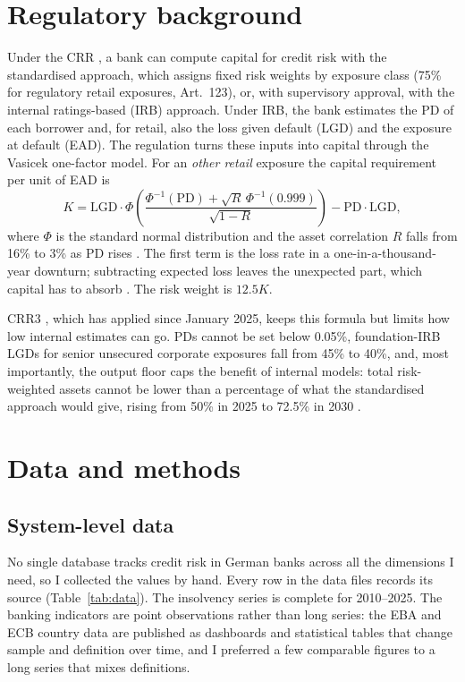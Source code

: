 \documentclass[11pt,a4paper]{article}
\begin{document}
\section{Regulatory background}
Under the CRR \citep{crr}, a bank can compute capital for credit risk with the standardised approach, which assigns fixed risk weights by exposure class (75\% for regulatory retail exposures, Art.~123), or, with supervisory approval, with the internal ratings-based (IRB) approach. Under IRB, the bank estimates the PD of each borrower and, for retail, also the loss given default (LGD) and the exposure at default (EAD). The regulation turns these inputs into capital through the Vasicek one-factor model. For an \textit{other retail} exposure the capital requirement per unit of EAD is
\begin{equation}
K = \text{LGD}\cdot\Phi\!\left(\frac{\Phi^{-1}(\text{PD})+\sqrt{R}\,\Phi^{-1}(0.999)}{\sqrt{1-R}}\right)-\text{PD}\cdot\text{LGD},
\end{equation}
where $\Phi$ is the standard normal distribution and the asset correlation $R$ falls from 16\% to 3\% as PD rises \citep[Art.~154]{crr}. The first term is the loss rate in a one-in-a-thousand-year downturn; subtracting expected loss leaves the unexpected part, which capital has to absorb \citep{bcbs2005}. The risk weight is $12.5K$.

CRR3 \citep{crr3}, which has applied since January 2025, keeps this formula but limits how low internal estimates can go. PDs cannot be set below 0.05\%, foundation-IRB LGDs for senior unsecured corporate exposures fall from 45\% to 40\%, and, most importantly, the output floor caps the benefit of internal models: total risk-weighted assets cannot be lower than a percentage of what the standardised approach would give, rising from 50\% in 2025 to 72.5\% in 2030 \citep{pwc_crr3}.

\section{Data and methods}
\subsection{System-level data}
No single database tracks credit risk in German banks across all the dimensions I need, so I collected the values by hand. Every row in the data files records its source (Table~\ref{tab:data}). The insolvency series is complete for 2010--2025. The banking indicators are point observations rather than long series: the EBA and ECB country data are published as dashboards and statistical tables that change sample and definition over time, and I preferred a few comparable figures to a long series that mixes definitions.
\end{document}
